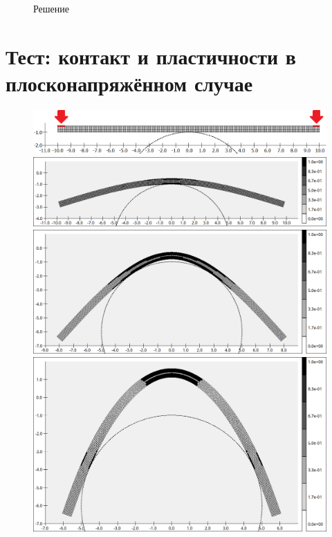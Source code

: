 \begin{figure}[!h]
	\caption{Решение}
	\label{fig:test1}
\end{figure}

\newpage
\section{Тест: контакт и пластичности в плосконапряжённом случае}
\begin{figure}[!h]
	\centering
	\includegraphics[height=0.08\textheight]{pictures/contact_test.png}
	\includegraphics[height=0.13\textheight]{pictures/0.png}
	\includegraphics[height=0.2\textheight]{pictures/1.png}
	\includegraphics[height=0.2\textheight]{pictures/2.png}
	

\end{figure}
